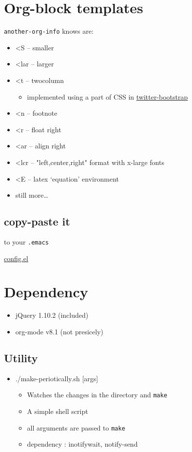 \section{Org-block templates}
\label{sec-6}

\texttt{another-org-info} knows are:

\begin{itemize}
\item <S -- smaller
\item <lar -- larger
\item <t -- twocolumn
\begin{itemize}
\item implemented using a part of CSS in \href{http://getbootstrap.com/}{twitter-bootstrap}
\end{itemize}
\item <n -- footnote
\item <r -- float right
\item <ar -- align right
\item <lcr -- "left,center,right" format with x-large fonts
\item <E -- latex `equation' environment
\item still more\ldots{}
\end{itemize}

\subsection{copy-paste it}
\label{sec-6-1}

to your \texttt{.emacs}

\begin{center}
\url{config.el}
\end{center}
\section{Dependency}
\label{sec-7}
\label{dependency}

\begin{itemize}
\item jQuery 1.10.2 (included)
\item org-mode v8.1 (not presicely)
\end{itemize}

\subsection{Utility}
\label{sec-7-1}

\begin{itemize}
\item ./make-periotically.sh [args]
\begin{itemize}
\item Watches the changes in the directory and \texttt{make}
\item A simple shell script
\item all arguments are passed to \texttt{make}
\item dependency : inotifywait, notify-send
\end{itemize}
\end{itemize}
